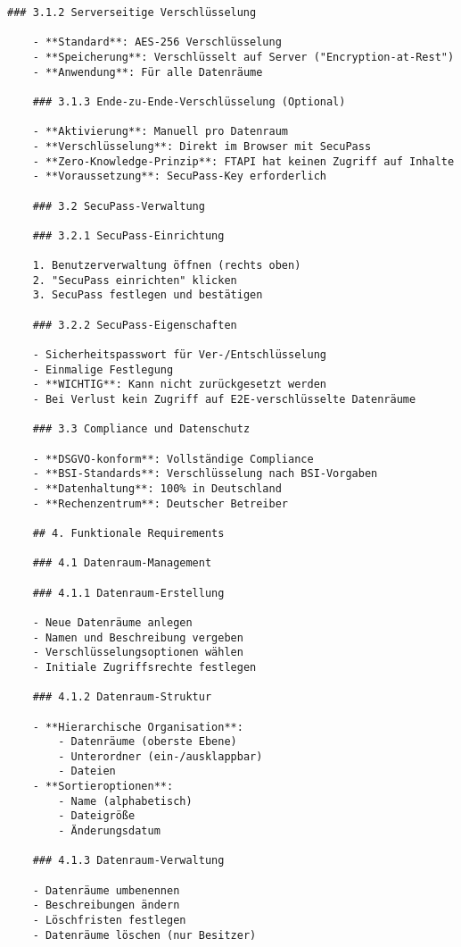 \begin{Verbatim}[breaklines=true]
    ### 3.1.2 Serverseitige Verschlüsselung
    
    - **Standard**: AES-256 Verschlüsselung
    - **Speicherung**: Verschlüsselt auf Server ("Encryption-at-Rest")
    - **Anwendung**: Für alle Datenräume
    
    ### 3.1.3 Ende-zu-Ende-Verschlüsselung (Optional)
    
    - **Aktivierung**: Manuell pro Datenraum
    - **Verschlüsselung**: Direkt im Browser mit SecuPass
    - **Zero-Knowledge-Prinzip**: FTAPI hat keinen Zugriff auf Inhalte
    - **Voraussetzung**: SecuPass-Key erforderlich
    
    ### 3.2 SecuPass-Verwaltung
    
    ### 3.2.1 SecuPass-Einrichtung
    
    1. Benutzerverwaltung öffnen (rechts oben)
    2. "SecuPass einrichten" klicken
    3. SecuPass festlegen und bestätigen
    
    ### 3.2.2 SecuPass-Eigenschaften
    
    - Sicherheitspasswort für Ver-/Entschlüsselung
    - Einmalige Festlegung
    - **WICHTIG**: Kann nicht zurückgesetzt werden
    - Bei Verlust kein Zugriff auf E2E-verschlüsselte Datenräume
    
    ### 3.3 Compliance und Datenschutz
    
    - **DSGVO-konform**: Vollständige Compliance
    - **BSI-Standards**: Verschlüsselung nach BSI-Vorgaben
    - **Datenhaltung**: 100% in Deutschland
    - **Rechenzentrum**: Deutscher Betreiber
    
    ## 4. Funktionale Requirements
    
    ### 4.1 Datenraum-Management
    
    ### 4.1.1 Datenraum-Erstellung
    
    - Neue Datenräume anlegen
    - Namen und Beschreibung vergeben
    - Verschlüsselungsoptionen wählen
    - Initiale Zugriffsrechte festlegen
    
    ### 4.1.2 Datenraum-Struktur
    
    - **Hierarchische Organisation**:
        - Datenräume (oberste Ebene)
        - Unterordner (ein-/ausklappbar)
        - Dateien
    - **Sortieroptionen**:
        - Name (alphabetisch)
        - Dateigröße
        - Änderungsdatum
    
    ### 4.1.3 Datenraum-Verwaltung
    
    - Datenräume umbenennen
    - Beschreibungen ändern
    - Löschfristen festlegen
    - Datenräume löschen (nur Besitzer)
    

\end{Verbatim}
